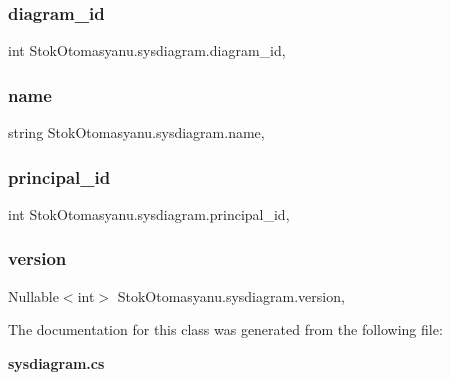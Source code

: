 \subsubsection{diagram\+\_\+id}
{\footnotesize\ttfamily int Stok\+Otomasyanu.\+sysdiagram.\+diagram\+\_\+id\hspace{0.3cm}{\ttfamily [get]}, {\ttfamily [set]}}

\mbox{\label{class_stok_otomasyanu_1_1sysdiagram_a1c0a728820b501857858a90cc254eb2c}} 
\subsubsection{name}
{\footnotesize\ttfamily string Stok\+Otomasyanu.\+sysdiagram.\+name\hspace{0.3cm}{\ttfamily [get]}, {\ttfamily [set]}}

\mbox{\label{class_stok_otomasyanu_1_1sysdiagram_afb1b3e29d50dccaa1a7dd47fb10319fd}} 
\subsubsection{principal\+\_\+id}
{\footnotesize\ttfamily int Stok\+Otomasyanu.\+sysdiagram.\+principal\+\_\+id\hspace{0.3cm}{\ttfamily [get]}, {\ttfamily [set]}}

\mbox{\label{class_stok_otomasyanu_1_1sysdiagram_a8a747490e07e616953d2a4fd15323e9a}} 
\subsubsection{version}
{\footnotesize\ttfamily Nullable$<$int$>$ Stok\+Otomasyanu.\+sysdiagram.\+version\hspace{0.3cm}{\ttfamily [get]}, {\ttfamily [set]}}



The documentation for this class was generated from the following file\+:\begin{DoxyCompactItemize}
\item 
\textbf{ sysdiagram.\+cs}\end{DoxyCompactItemize}
